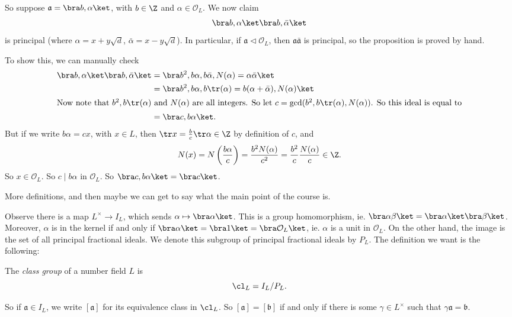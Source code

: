 \documentclass[a4paper]{article}
\begin{document}
\begin{eg}
  So suppose $\mathfrak{a} = \bra b, \alpha\ket$, with $b \in \Z$ and $\alpha \in \mathcal{O}_L$. We now claim
  \[
    \bra b, \alpha\ket \bra b, \bar{\alpha}\ket
  \]
  is principal (where $\alpha = x + y \sqrt{d}$, $\bar{\alpha} = x - y \sqrt{d}$). In particular, if $\mathfrak{a} \lhd \mathcal{O}_L$, then $\mathfrak{a} \bar{\mathfrak{a}}$ is principal, so the proposition is proved by hand.

  To show this, we can manually check
  \begin{align*}
    \bra b, \alpha\ket \bra b, \bar{\alpha}\ket &= \bra b^2, b\alpha, b\bar{\alpha}, N(\alpha) = \alpha\bar{\alpha}\ket\\
    &= \bra b^2, b\alpha, b\tr(\alpha) = b(\alpha + \bar{\alpha}), N(\alpha)\ket\\
    \intertext{Now note that $b^2, b\tr(\alpha)$ and $N(\alpha)$ are all integers. So let $c = \gcd(b^2, b\tr(\alpha), N(\alpha))$. So this ideal is equal to}
    &= \bra c, b\alpha\ket.
  \end{align*}
  But if we write $b\alpha = cx$, with $x \in L$, then $\tr x = \frac{b}{c} \tr \alpha \in \Z$ by definition of $c$, and
  \[
    N(x) = N\left(\frac{b\alpha}{c}\right) = \frac{b^2 N(\alpha)}{c^2} = \frac{b^2}{c} \frac{N(\alpha)}{c} \in \Z.
  \]
  So $x \in \mathcal{O}_L$. So $c \mid b\alpha$ in $\mathcal{O}_L$. So $\bra c, b\alpha\ket = \bra c\ket$.
\end{eg}
More definitions, and then maybe we can get to say what the main point of the course is.

Observe there is a map $L^\times \to I_L$, which sends $\alpha \mapsto \bra \alpha\ket$. This is a group homomorphism, ie. $\bra \alpha\beta\ket = \bra \alpha\ket \bra \beta\ket$. Moreover, $\alpha$ is in the kernel if and only if $\bra \alpha\ket = \bra 1\ket = \bra \mathcal{O}_L\ket$, ie. $\alpha$ is a unit in $\mathcal{O}_L$. On the other hand, the image is the set of all principal fractional ideals. We denote this subgroup of principal fractional ideals by $P_L$. The definition we want is the following:

\begin{defi}
  The \emph{class group} of a number field $L$ is
  \[
    \cl_L = I_L/P_L.
  \]
\end{defi}
So if $\mathfrak{a} \in I_L$, we write $[\mathfrak{a}]$ for its equivalence class in $\cl_L$. So $[\mathfrak{a}] = [\mathfrak{b}]$ if and only if there is some $\gamma\in L^\times$ such that $\gamma \mathfrak{a} = \mathfrak{b}$.
\end{document}
